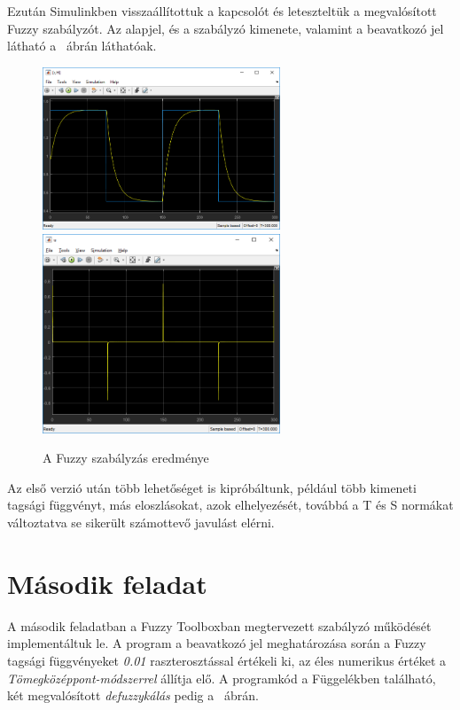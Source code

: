 Ezután Simulinkben visszaállítottuk a kapcsolót és leteszteltük a megvalósított Fuzzy szabályzót. Az alapjel, és a szabályzó kimenete, valamint a beavatkozó jel látható a ~ábrán láthatóak.

\begin{figure}[!h]
	\centering
	\includegraphics[width=71mm, keepaspectratio]{figures/m01/fuzzy4.png}\hspace{5mm}
	\includegraphics[width=71mm, keepaspectratio]{figures/m01/fuzzy5.png}
	\caption{A Fuzzy szabályzás eredménye} 
	\label{fig:FirstFuzzyResults}
\end{figure}
Az első verzió után több lehetőséget is kipróbáltunk, például több kimeneti tagsági függvényt, más eloszlásokat, azok elhelyezését, továbbá a T és S normákat változtatva se sikerült számottevő javulást elérni.

\newpage
\section{Második feladat}
A második feladatban a Fuzzy Toolboxban megtervezett szabályzó működését implementáltuk le. A program a beavatkozó jel meghatározása során a Fuzzy tagsági függvényeket \textit{0.01} raszterosztással értékeli ki, az éles numerikus értéket a \textit{Tömegközéppont-módszerrel} állítja elő. A programkód a Függelékben található, két megvalósított \textit{defuzzykálás} pedig a ~ábrán.


